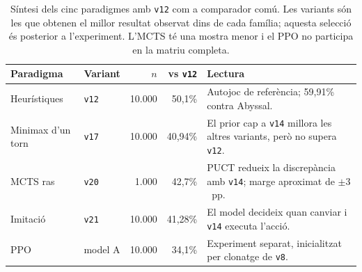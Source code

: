 \begin{table}[htbp]
\centering
\caption{Síntesi dels cinc paradigmes amb \texttt{v12} com a comparador comú. Les variants són les que obtenen el millor resultat observat dins de cada família; aquesta selecció és posterior a l'experiment. L'MCTS té una mostra menor i el PPO no participa en la matriu completa.}
\label{tab:paradigm_summary}
\small
\begin{tabularx}{\textwidth}{llrrX}
\toprule
\textbf{Paradigma} & \textbf{Variant} & \textbf{$n$} & \textbf{vs \texttt{v12}} & \textbf{Lectura} \\
\midrule
Heurístiques & \texttt{v12} & 10.000 & 50,1\% & Autojoc de referència; 59,91\% contra Abyssal. \\
Minimax d'un torn & \texttt{v17} & 10.000 & 40,94\% & El prior cap a \texttt{v14} millora les altres variants, però no supera \texttt{v12}. \\
MCTS ras & \texttt{v20} & 1.000 & 42,7\% & PUCT redueix la discrepància amb \texttt{v14}; marge aproximat de $\pm 3$~pp. \\
Imitació & \texttt{v21} & 10.000 & 41,28\% & El model decideix quan canviar i \texttt{v14} executa l'acció. \\
PPO & model A & 10.000 & 34,1\% & Experiment separat, inicialitzat per clonatge de \texttt{v8}. \\
\bottomrule
\end{tabularx}
\end{table}
